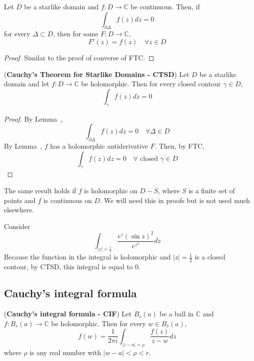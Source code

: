 \begin{lemma}\label{lem:ctLem2}
	Let $D$ be a starlike domain and $f: D \rightarrow \mathbb{C}$ be continuous. Then, if
	\[
		\int_{\partial \Delta} f(z) dz = 0
	\]
	for every $\Delta \subset D$, then for some $F: D \rightarrow \mathbb{C}$,
	\[
		F'(z) = f(z) \quad \forall z \in D
	\]
\end{lemma}

\begin{proof}
	Similar to the proof of converse of FTC.
\end{proof}

\begin{theorem}
	(\textbf{Cauchy's Theorem for Starlike Domains - CTSD}) Let $D$ be a starlike domain and let $f: D \rightarrow \mathbb{C}$ be holomorphic. Then for every closed contour $\gamma \in D$,
	\[
		\int_{\gamma} f(z) dz = 0
	\]
\end{theorem}

\begin{proof}
	By Lemma~,
	\[
		\int_{\partial \Delta} f(z) dz = 0 \quad \forall \Delta \in D
	\]
	By Lemma~, $f$ has a holomorphic antiderivative $F$. Then, by FTC,
	\[
		\int_{\gamma} f(z) dz = 0 \quad \forall \text{ closed } \gamma \in D
	\]
\end{proof}

\begin{remark}
	The same result holds if $f$ is holomorphic on $D - S$, where $S$ is a finite set of points and $f$ is continuous on $D$. We will need this in proofs but is not used much elsewhere.
\end{remark}

\begin{example}
	Consider
	\[
		\int_{|z| = \frac{1}{2}} \frac{e^z {(\sin z)}^2}{e^{z^2}} dz
	\]
	Because the function in the integral is holomorphic and $|z| = \frac{1}{2}$ is a closed contour, by CTSD, this integral is equal to $0$.
\end{example}

\subsection{Cauchy's integral formula}

\begin{theorem}
	(\textbf{Cauchy's integral formula - CIF}) Let $B_r(a)$ be a ball in $\mathbb{C}$ and $f: B_r(a) \rightarrow \mathbb{C}$ be holomorphic. Then for every $w \in B_r(a)$,
	\[
		f(w) = \frac{1}{2 \pi i} \int_{|z - a| = \rho} \frac{f(z)}{z - w} dz
	\]
	where $\rho$ is any real number with $|w - a| < \rho < r$.
\end{theorem}

